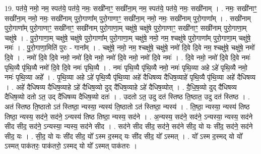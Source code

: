 \documentclass[17pt]{extarticle}
\begin{document}
19. पत॑ये॒ नमो॒ नम॒ स्पत॑ये॒ पत॑ये॒ नमः॒ सखी॑नाꣳ॒॒ सखी॑ना॒म् नम॒ स्पत॑ये॒ पत॑ये॒ नमः॒ सखी॑नाम् । . नमः॒ सखी॑नाꣳ॒॒ सखी॑ना॒म् नमो॒ नमः॒ सखी॑नाम् पुरो॒गाणा᳚म् पुरो॒गाणाꣳ॒॒ सखी॑ना॒म् नमो॒ नमः॒ सखी॑नाम् पुरो॒गाणा᳚म् । . सखी॑नाम् पुरो॒गाणा᳚म् पुरो॒गाणाꣳ॒॒ सखी॑नाꣳ॒॒ सखी॑नाम् पुरो॒गाणा॒म् चक्षु॑षे॒ चक्षु॑षे पुरो॒गाणाꣳ॒॒ सखी॑नाꣳ॒॒ सखी॑नाम् पुरो॒गाणा॒म् चक्षु॑षे । . पु॒रो॒गाणा॒म् चक्षु॑षे॒ चक्षु॑षे पुरो॒गाणा᳚म् पुरो॒गाणा॒म् चक्षु॑षे॒ नमो॒ नम॒ श्चक्षु॑षे पुरो॒गाणा᳚म् पुरो॒गाणा॒म् चक्षु॑षे॒ नमः॑ । . पु॒रो॒गाणा॒मिति॑ पुरः - गाना᳚म् । . चक्षु॑षे॒ नमो॒ नम॒ श्चक्षु॑षे॒ चक्षु॑षे॒ नमो॑ दि॒वे दि॒वे नम॒ श्चक्षु॑षे॒ चक्षु॑षे॒ नमो॑ दि॒वे । . नमो॑ दि॒वे दि॒वे नमो॒ नमो॑ दि॒वे नमो॒ नमो॑ दि॒वे नमो॒ नमो॑ दि॒वे नमः॑ । . दि॒वे नमो॒ नमो॑ दि॒वे दि॒वे नमः॑ पृथि॒व्यै पृ॑थि॒व्यै नमो॑ दि॒वे दि॒वे नमः॑ पृथि॒व्यै । . नमः॑ पृथि॒व्यै पृ॑थि॒व्यै नमो॒ नमः॑ पृथि॒व्या अहे ऽहे॑ पृथि॒व्यै नमो॒ नमः॑ पृथि॒व्या अहे᳚ । . पृ॒थि॒व्या अहे ऽहे॑ पृथि॒व्यै पृ॑थि॒व्या अहे॑ दैधिषव्य दैधिष॒व्याहे॑ पृथि॒व्यै पृ॑थि॒व्या अहे॑ दैधिषव्य । . अहे॑ दैधिषव्य दैधिष॒व्याहे ऽहे॑ दैधिष॒व्यो दुद् दै॑धिष॒व्याहे ऽहे॑ दैधिष॒व्योत् । . दै॒धि॒ष॒व्यो दुद् दै॑धिषव्य दैधिष॒व्यो दतो ऽत॒ उद् दै॑धिषव्य दैधिष॒व्यो दतः॑ । . उदतो ऽत॒ उदु दत॑ स्तिष्ठ ति॒ष्ठात॒ उदु दत॑ स्तिष्ठ । . अत॑ स्तिष्ठ ति॒ष्ठातो ऽत॑ स्तिष्ठा॒ न्यस्या॒ न्यस्य॑ ति॒ष्ठातो ऽत॑ स्तिष्ठा॒ न्यस्य॑ । . ति॒ष्ठा॒ न्यस्या॒ न्यस्य॑ तिष्ठ तिष्ठा॒ न्यस्य॒ सद॑ने॒ सद॑ने॒ ऽन्यस्य॑ तिष्ठ तिष्ठा॒ न्यस्य॒ सद॑ने । . अ॒न्यस्य॒ सद॑ने॒ सद॑ने॒ ऽन्यस्या॒ न्यस्य॒ सद॑ने सीद सीद॒ सद॑ने॒ ऽन्यस्या॒ न्यस्य॒ सद॑ने सीद । . सद॑ने सीद सीद॒ सद॑ने॒ सद॑ने सीद॒ यो यः सी॑द॒ सद॑ने॒ सद॑ने सीद॒ यः । . सी॒द॒ यो यः सी॑द सीद॒ यो᳚ ऽस्म द॒स्मद् यः सी॑द सीद॒ यो᳚ ऽस्मत् । . यो᳚ ऽस्म द॒स्मद् यो यो᳚ ऽस्मत् पाक॑तरः॒ पाक॑तरो॒ ऽस्मद् यो यो᳚ ऽस्मत् पाक॑तरः । \newline
\end{document}
